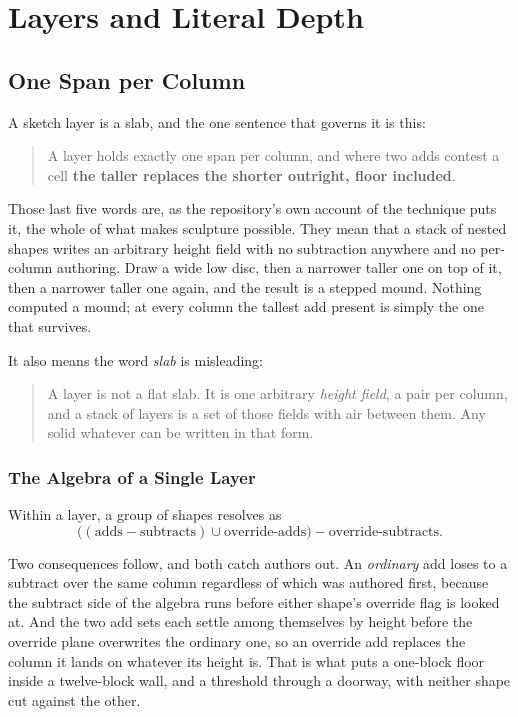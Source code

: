 \chapter{Layers and Literal Depth}
\label{ch:layers}

\section{One Span per Column}

A sketch layer is a slab, and the one sentence that governs it is this:

\begin{quote}
A layer holds exactly one span per column, and where two adds contest a cell
\textbf{the taller replaces the shorter outright, floor included}.
\end{quote}

Those last five words are, as the repository's own account of the technique puts
it, the whole of what makes sculpture possible. They mean that a stack of nested
shapes writes an arbitrary height field with no subtraction anywhere and no
per-column authoring. Draw a wide low disc, then a narrower taller one on top of
it, then a narrower taller one again, and the result is a stepped mound. Nothing
computed a mound; at every column the tallest add present is simply the one that
survives.

It also means the word \emph{slab} is misleading:

\begin{quote}
A layer is not a flat slab. It is one arbitrary \emph{height field}, a
 pair per column, and a stack of layers is a set of those fields
with air between them. Any solid whatever can be written in that form.
\end{quote}

\subsection{The Algebra of a Single Layer}

Within a layer, a group of shapes resolves as
\[
\bigl((\text{adds} - \text{subtracts}) \cup \text{override-adds}\bigr) - \text{override-subtracts}.
\]

Two consequences follow, and both catch authors out. An \emph{ordinary} add loses
to a subtract over the same column regardless of which was authored first, because
the subtract side of the algebra runs before either shape's override flag is
looked at. And the two add sets each settle among themselves by height before the
override plane overwrites the ordinary one, so an override add replaces the column
it lands on whatever its height is. That is what puts a one-block floor
inside a twelve-block wall, and a threshold through a doorway, with neither shape
cut against the other.

